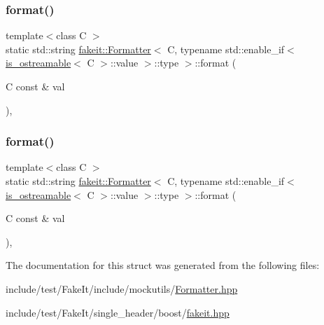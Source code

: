 \subsubsection{\texorpdfstring{format()}{format()}\hspace{0.1cm}{\footnotesize\ttfamily [8/9]}}
{\footnotesize\ttfamily template$<$class C $>$ \\
static std\+::string \mbox{\hyperlink{structfakeit_1_1Formatter}{fakeit\+::\+Formatter}}$<$ C, typename std\+::enable\+\_\+if$<$ \mbox{\hyperlink{classfakeit_1_1is__ostreamable}{is\+\_\+ostreamable}}$<$ C $>$\+::value $>$\+::type $>$\+::format (\begin{DoxyParamCaption}\item[{C const \&}]{val }\end{DoxyParamCaption})\hspace{0.3cm}{\ttfamily [inline]}, {\ttfamily [static]}}

\mbox{\label{structfakeit_1_1Formatter_3_01C_00_01typename_01std_1_1enable__if_3_01is__ostreamable_3_01C_01_4_1_1value_01_4_1_1type_01_4_af196fc780a3f1cfe986246af4c65a718}} 
\subsubsection{\texorpdfstring{format()}{format()}\hspace{0.1cm}{\footnotesize\ttfamily [9/9]}}
{\footnotesize\ttfamily template$<$class C $>$ \\
static std\+::string \mbox{\hyperlink{structfakeit_1_1Formatter}{fakeit\+::\+Formatter}}$<$ C, typename std\+::enable\+\_\+if$<$ \mbox{\hyperlink{classfakeit_1_1is__ostreamable}{is\+\_\+ostreamable}}$<$ C $>$\+::value $>$\+::type $>$\+::format (\begin{DoxyParamCaption}\item[{C const \&}]{val }\end{DoxyParamCaption})\hspace{0.3cm}{\ttfamily [inline]}, {\ttfamily [static]}}



The documentation for this struct was generated from the following files\+:\begin{DoxyCompactItemize}
\item 
include/test/\+Fake\+It/include/mockutils/\mbox{\hyperlink{Formatter_8hpp}{Formatter.\+hpp}}\item 
include/test/\+Fake\+It/single\+\_\+header/boost/\mbox{\hyperlink{single__header_2boost_2fakeit_8hpp}{fakeit.\+hpp}}\end{DoxyCompactItemize}
